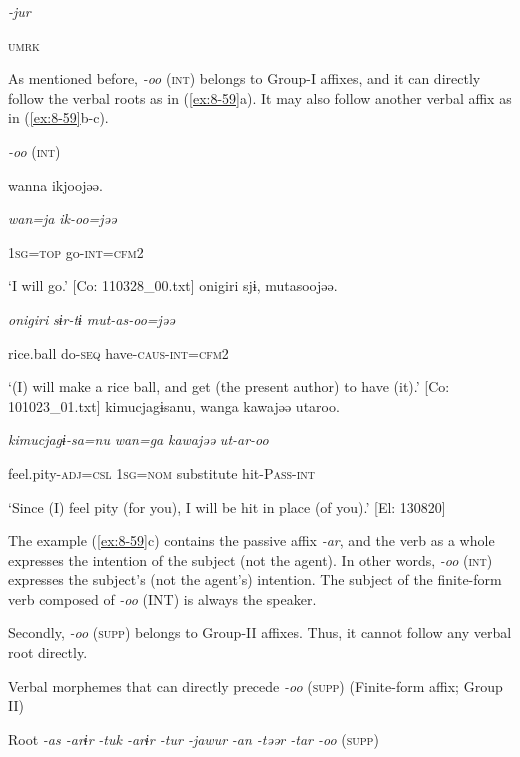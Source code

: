           \textit{{}-jur} 

          \textsc{umrk}

As mentioned before, \textit{{}-oo} (\textsc{int}) belongs to Group-I affixes, and it can directly follow the verbal roots as in (\ref{ex:8-59}a). It may also follow another verbal affix as in (\ref{ex:8-59}b-c).

\ea\label{ex:8-59}
  \textit{{}-oo} (\textsc{int})

\ea {\US}
\glll   wanna  ikjoojəə.

      \textit{wan=ja}  \textit{ik-oo=jəə}

      1\textsc{sg}=\textsc{top}  go-\textsc{int}=\textsc{cfm}2

\glt ‘I will go.’ [Co: 110328\_00.txt]
\ex {\TM}
\glll  {\textbar}onigiri{\textbar}  sjɨ,  mutasoojəə.

      \textit{onigiri}  \textit{sɨr-tɨ}  \textit{mut-as-oo=jəə}

      rice.ball  do-\textsc{seq}  have-\textsc{caus}-\textsc{int}=\textsc{cfm}2

\glt ‘(I) will make a rice ball, and get (the present author) to have (it).’ [Co: 101023\_01.txt]
\ex {\TM}
\glll  kimucjagɨsanu,  wanga  kawajəə  utaroo.

      \textit{kimucjagɨ-sa=nu}  \textit{wan=ga}  \textit{kawajəə}  \textit{ut-ar-oo}

      feel.pity-\textsc{adj}=\textsc{csl}  1\textsc{sg}=\textsc{nom}  substitute  hit-P\textsc{ass}-\textsc{int}

\glt ‘Since (I) feel pity (for you), I will be hit in place (of you).’ [El: 130820]

The example (\ref{ex:8-59}c) contains the passive affix \textit{{}-ar}, and the verb as a whole expresses the intention of the subject (not the agent). In other words, \textit{{}-oo} (\textsc{int}) expresses the subject’s (not the agent’s) intention. The subject of the finite-form verb composed of \textit{{}-oo} (INT) is always the speaker.

  Secondly, \textit{{}-oo} (\textsc{supp}) belongs to Group-II affixes. Thus, it cannot follow any verbal root directly.

\ea\label{ex:8-60}
  Verbal morphemes that can directly precede \textit{-oo} (\textsc{supp}) (Finite-form affix; Group II)

  Root  \textit{{}-as  {}-arɨr} %
\textit{{}-tuk  {}-arɨr  {}-tur  {}-jawur} %
\textit{{}-an  {}-təər  {}-tar  {}-oo} (\textsc{supp})

